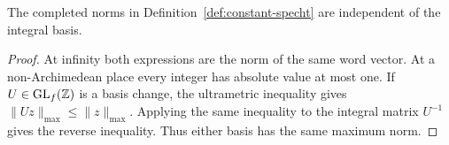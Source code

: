 \begin{lemma}
\label{lem:specht-basis-independence}
\leanok
The completed norms in Definition~\ref{def:constant-specht} are independent
of the integral basis.
\end{lemma}
\begin{proof}
At infinity both expressions are the norm of the same word vector.
At a non-Archimedean place every integer has absolute value at most one.
If $U\in\operatorname{GL}_f(\mathbb Z)$ is a basis change, the ultrametric inequality gives
$\|Uz\|_{\max}\le\|z\|_{\max}$. Applying the same inequality to the integral
matrix $U^{-1}$ gives the reverse inequality. Thus either basis has the
same maximum norm.
\end{proof}

